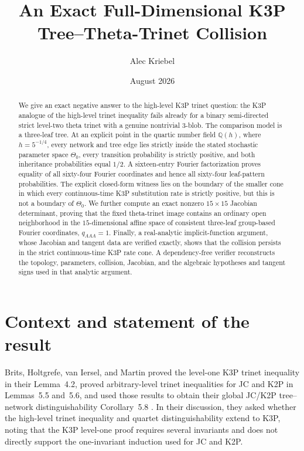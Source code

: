 \documentclass[11pt]{article}
\title{An Exact Full-Dimensional K3P\\Tree--Theta-Trinet Collision}
\author{Alec Kriebel}
\date{August 2026}
\theoremstyle{remark}
\newcommand{\ThetaZero}{\Theta_{0}}
\begin{document}
\maketitle

\begin{abstract}
We give an exact negative answer to the high-level K3P trinet question: the K3P analogue of the high-level trinet inequality fails already for a binary semi-directed strict level-two theta trinet with a genuine nontrivial $3$-blob.  The comparison model is a three-leaf tree.  At an explicit point in the quartic number field $\mathbb{Q}(h)$, where $h=5^{-1/4}$, every network and tree edge lies strictly inside the stated stochastic parameter space $\ThetaZero$, every transition probability is strictly positive, and both inheritance probabilities equal $1/2$.  A sixteen-entry Fourier factorization proves equality of all sixty-four Fourier coordinates and hence all sixty-four leaf-pattern probabilities.  The explicit closed-form witness lies on the boundary of the smaller cone in which every continuous-time K3P substitution rate is strictly positive, but this is not a boundary of $\ThetaZero$.  We further compute an exact nonzero $15\times15$ Jacobian determinant, proving that the fixed theta-trinet image contains an ordinary open neighborhood in the $15$-dimensional affine space of consistent three-leaf group-based Fourier coordinates, $q_{AAA}=1$.  Finally, a real-analytic implicit-function argument, whose Jacobian and tangent data are verified exactly, shows that the collision persists in the strict continuous-time K3P rate cone.  A dependency-free verifier reconstructs the topology, parameters, collision, Jacobian, and the algebraic hypotheses and tangent signs used in that analytic argument.
\end{abstract}

\section{Context and statement of the result}

Brits, Holtgrefe, van Iersel, and Martin proved the level-one K3P trinet inequality in their Lemma~4.2, proved arbitrary-level trinet inequalities for JC and K2P in Lemmas~5.5 and~5.6, and used those results to obtain their global JC/K2P tree--network distinguishability Corollary~5.8 \cite{BritsHoltgrefeVanIerselMartin2026}.  In their discussion, they asked whether the high-level trinet inequality and quartet distinguishability extend to K3P, noting that the K3P level-one proof requires several invariants and does not directly support the one-invariant induction used for JC and K2P.
\end{document}
